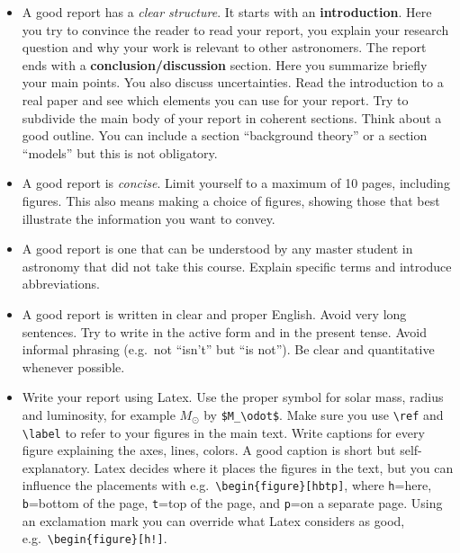 \begin{itemize}

\item A good report has a \emph{clear structure}. It starts with an
  \textbf{introduction}. Here you try to convince the reader to read
  your report, you explain your research question and why your work is
  relevant to other astronomers.  The report ends with a
  \textbf{conclusion/discussion} section. Here you summarize briefly
  your main points. You also discuss uncertainties. Read the
  introduction to a real paper and see which elements you can use for
  your report.  Try to subdivide the main body of your report in
  coherent sections.  Think about a good outline. You can include a
  section ``background theory'' or a section ``models'' but this is
  not obligatory.

\item A good report is \emph{concise}. Limit yourself to a maximum of
  10 pages, including figures. This also means making a choice of
  figures, showing those that best illustrate the information you want
  to convey.

\item A good report is one that can be understood by any master
  student in astronomy that did not take this course. Explain specific
  terms and introduce abbreviations. 

\item A good report is written in clear and proper English. Avoid very
  long sentences. Try to write in the active form and in the present
  tense. Avoid informal phrasing (e.g.\ not ``isn't'' but ``is
  not'').  Be clear and quantitative whenever possible.

\item Write your report using Latex.  Use the proper symbol for solar
  mass, radius and luminosity, for example $M_\odot$ by
  \verb|$M_\odot$|.  Make sure you use \verb|\ref| and \verb|\label|
  to refer to your figures in the main text. Write captions for every
  figure explaining the axes, lines, colors. A good caption is short
  but self-explanatory. Latex decides where it places the figures in
  the text, but you can influence the placements with e.g.\
  \verb|\begin{figure}[hbtp]|, where \verb|h|=here, \verb|b|=bottom of
    the page, \verb|t|=top of the page, and \verb|p|=on a separate
    page. Using an exclamation mark you can override what Latex
    considers as good, e.g.\ \verb|\begin{figure}[h!]|.

\end{itemize}







